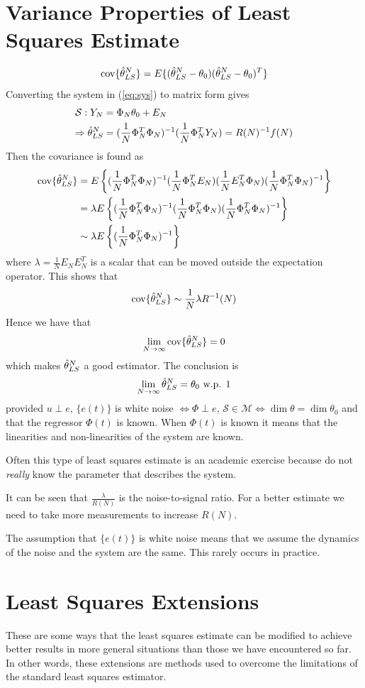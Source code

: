 \documentclass[lecture,12pt,]{pcms-l}
\begin{document}
\section{Variance Properties of Least Squares Estimate}
$$\text{cov}\{\hat{\theta}_{LS}^N\} = E\{(\hat{\theta}_{LS}^N-\theta_0)(\hat{\theta}_{LS}^N-\theta_0)^T\}$$
Converting the system in (\ref{eq:sys}) to matrix form gives
\begin{align*}
\mathcal{S}: Y_N &= \Phi_N\theta_0+E_N \\
\Rightarrow \hat{\theta}_{LS}^N &= (\frac{1}{N}\Phi_N^T\Phi_N)^{-1}(\frac{1}{N}\Phi_N^TY_N) = R(N)^{-1}f(N)
\end{align*}
Then the covariance is found as
\begin{align*}
\text{cov}\{\hat{\theta}_{LS}^N\} &= E\left\lbrace(\frac{1}{N}\Phi_N^T\Phi_N)^{-1} (\frac{1}{N}\Phi_N^TE_N) (\frac{1}{N}E_N^T\Phi_N) (\frac{1}{N}\Phi_N^T\Phi_N)^{-1}\right\rbrace \\
&= \lambda E\left\lbrace(\frac{1}{N}\Phi_N^T\Phi_N)^{-1} (\frac{1}{N}\Phi_N^T\Phi_N) (\frac{1}{N}\Phi_N^T\Phi_N)^{-1}\right\rbrace \\
&\sim \lambda E\left\lbrace(\frac{1}{N}\Phi_N^T\Phi_N)^{-1}\right\rbrace
\end{align*}
where $\lambda = \frac{1}{N}E_NE_N^T$ is a scalar that can be moved outside the expectation operator. This shows that
$$\text{cov}\{\hat{\theta}_{LS}^N\} \sim \frac{1}{N}\lambda R^{-1}(N)$$
Hence we have that
$$\lim_{N\to\infty}\text{cov}\{\hat{\theta}_{LS}^N\} = 0$$
which makes $\hat{\theta}_{LS}^N$ a good estimator. The conclusion is
$$\lim_{N\to\infty}\hat{\theta}_{LS}^N = \theta_0 \text{ w.p. } 1$$
provided $u\perp e$, $\{e(t)\}$ is white noise $\Leftrightarrow \Phi\perp e$, $\mathcal{S}\in\mathcal{M} \Leftrightarrow \dim\theta = \dim\theta_0$ and that the regressor $\Phi(t)$ is known. When $\Phi(t)$ is known it means that the linearities and non-linearities of the system are known.

Often this type of least squares estimate is an academic exercise because do not \textit{really} know the parameter that describes the system.

It can be seen that $\frac{\lambda}{R(N)}$ is the noise-to-signal ratio. For a better estimate we need to take more measurements to increase $R(N)$.

The assumption that $\{e(t)\}$ is white noise means that we assume the dynamics of the noise and the system are the same. This rarely occurs in practice.

\section{Least Squares Extensions}
These are some ways that the least squares estimate can be modified to achieve better results in more general situations than those we have encountered so far. In other words, these extensions are methods used to overcome the limitations of the standard least squares estimator.
\end{document}

